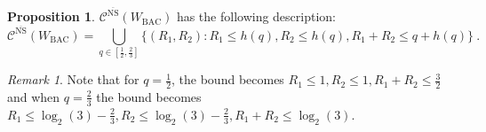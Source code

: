 \documentclass[11pt]{article}
\theoremstyle{definition}
\newtheorem{prop}[theo]{Proposition}
\theoremstyle{remark}
\newtheorem*{rk}{Remark}
\begin{document}
  \begin{prop}
    \label{prop:BACcapacityNSrelaxed}
     $\mathcal{C}^{\overline{\mathrm{NS}}}(W_{\text{BAC}})$ has the following description:
   \[ \mathcal{C}^{\overline{\mathrm{NS}}}(W_{\text{BAC}}) =  \bigcup_{q \in \left[\frac{1}{2},\frac{2}{3}\right]} \{ (R_1,R_2) : R_1 \leq h\left(q\right), R_2 \leq h\left(q\right), R_1+R_2 \leq q+h\left(q\right)\} \ . \]
  \end{prop}

  \begin{rk}
    Note that for $q=\frac{1}{2}$, the bound becomes $R_1 \leq 1, R_2 \leq 1, R_1+R_2 \leq \frac{3}{2}$ and when $q=\frac{2}{3}$ the bound becomes $R_1 \leq \log_2(3)-\frac{2}{3}, R_2 \leq \log_2(3)-\frac{2}{3}, R_1+R_2 \leq \log_2(3)$.
  \end{rk}
  
\end{document}
